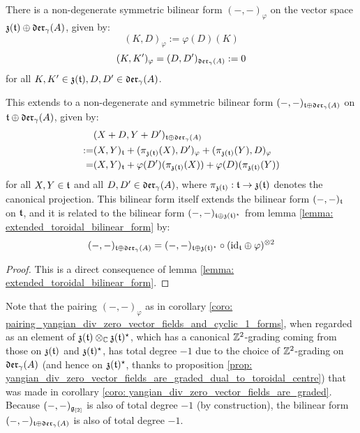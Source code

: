         \begin{corollary} \label{coro: pairing_yangian_div_zero_vector_fields_and_cyclic_1_forms}
            There is a non-degenerate symmetric bilinear form $(-, -)_{\varphi}$ on the vector space $\mathfrak{z}(\mathfrak{t}) \oplus \mathfrak{der}_{\gamma}(A)$, given by:
                $$(K, D)_{\varphi} := \varphi(D)(K)$$
                $$(K, K')_{\varphi} = (D, D')_{\mathfrak{der}_{\gamma}(A)} := 0$$
            for all $K, K' \in \mathfrak{z}(\mathfrak{t}), D, D' \in \mathfrak{der}_{\gamma}(A)$.

            This extends to a non-degenerate and symmetric bilinear form $(-, -)_{\mathfrak{t} \oplus \mathfrak{der}_{\gamma}(A)}$ on $\mathfrak{t} \oplus \mathfrak{der}_{\gamma}(A)$, given by:
                $$
                    \begin{aligned}
                        & ( X + D, Y + D' )_{\mathfrak{t} \oplus \mathfrak{der}_{\gamma}(A)}
                        \\
                        := & (X, Y)_{\mathfrak{t}} + ( \pi_{\mathfrak{z}(\mathfrak{t})}(X), D' )_{\varphi} + ( \pi_{\mathfrak{z}(\mathfrak{t})}(Y), D )_{\varphi}
                        \\
                        = & (X, Y)_{\mathfrak{t}} + \varphi(D')( \pi_{\mathfrak{z}(\mathfrak{t})}(X) ) + \varphi(D)( \pi_{\mathfrak{z}(\mathfrak{t})}(Y) )
                    \end{aligned}
                $$
            for all $X, Y \in \mathfrak{t}$ and all $D, D' \in \mathfrak{der}_{\gamma}(A)$, where $\pi_{\mathfrak{z}(\mathfrak{t})}: \mathfrak{t} \to \mathfrak{z}(\mathfrak{t})$ denotes the canonical projection. This bilinear form itself extends the bilinear form $(-, -)_{\mathfrak{t}}$ on $\mathfrak{t}$, and it is related to the bilinear form $(-, -)_{\mathfrak{t} \oplus \mathfrak{z}(\mathfrak{t})^{\star}}$ from lemma \ref{lemma: extended_toroidal_bilinear_form} by:
                $$(-, -)_{\toroidal \oplus \divzero} = (-, -)_{\toroidal \oplus \z(\toroidal)^{\star}} \circ ( \id_{\toroidal} \oplus \varphi )^{\tensor 2}$$
        \end{corollary}
            \begin{proof}
                This is a direct consequence of lemma \ref{lemma: extended_toroidal_bilinear_form}.
            \end{proof}
        \begin{remark}
            Note that the pairing $(-, -)_{\varphi}$ as in corollary \ref{coro: pairing_yangian_div_zero_vector_fields_and_cyclic_1_forms}, when regarded as an element of $\z(\toroidal) \tensor_{\bbC} \z(\toroidal)^{\star}$, which has a canonical $\mathbb{Z}^2$-grading coming from those on $\mathfrak{z}(\mathfrak{t})$ and $\mathfrak{z}(\mathfrak{t})^{\star}$, has total degree $-1$ due to the choice of $\mathbb{Z}^2$-grading on $\mathfrak{der}_{\gamma}(A)$ (and hence on $\mathfrak{z}(\mathfrak{t})^{\star}$, thanks to proposition \ref{prop: yangian_div_zero_vector_fields_are_graded_dual_to_toroidal_centre}) that was made in corollary \ref{coro: yangian_div_zero_vector_fields_are_graded}. Because $(-, -)_{\mathfrak{g}_{[2]}}$ is also of total degree $-1$ (by construction), the bilinear form $(-, -)_{\mathfrak{t} \oplus \mathfrak{der}_{\gamma}(A)}$ is also of total degree $-1$.
        \end{remark}

